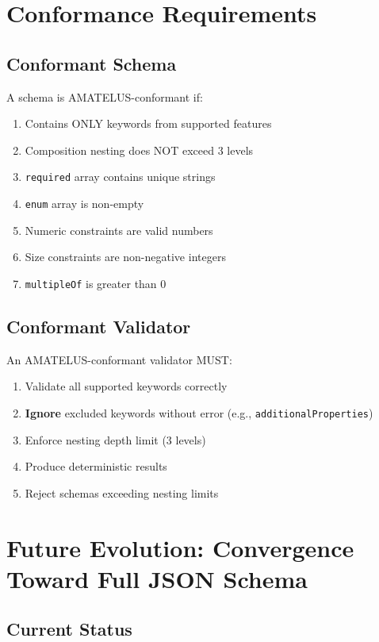 \section{Conformance Requirements}

\subsection{Conformant Schema}

A schema is AMATELUS-conformant if:

\begin{enumerate}
  \item Contains ONLY keywords from supported features
  \item Composition nesting does NOT exceed 3 levels
  \item \texttt{required} array contains unique strings
  \item \texttt{enum} array is non-empty
  \item Numeric constraints are valid numbers
  \item Size constraints are non-negative integers
  \item \texttt{multipleOf} is greater than 0
\end{enumerate}

\subsection{Conformant Validator}

An AMATELUS-conformant validator MUST:

\begin{enumerate}
  \item Validate all supported keywords correctly
  \item \textbf{Ignore} excluded keywords without error (e.g., \texttt{additionalProperties})
  \item Enforce nesting depth limit (3 levels)
  \item Produce deterministic results
  \item Reject schemas exceeding nesting limits
\end{enumerate}

\section{Future Evolution: Convergence Toward Full JSON Schema}

\subsection{Current Status}

